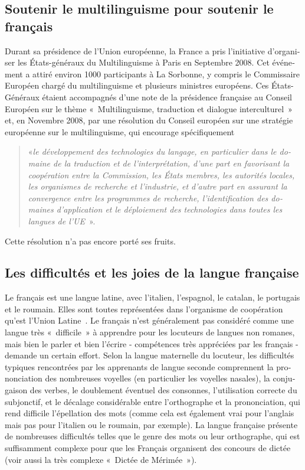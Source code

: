 \begin{french}
\begin{multicols}{2}
\subsection{Soutenir le multilinguisme pour soutenir le français}

Durant sa présidence de l'Union européenne, la France a pris
l'initiative d'organiser les États-généraux du
Multilinguisme à Paris en Septembre 2008. Cet événement a attiré
environ 1000 participants à La Sorbonne, y compris le Commissaire
Européen chargé du multilinguisme et plusieurs ministres
européens. Ces États-Généraux étaient accompagnés d'une note
de la présidence française au Conseil Européen sur le thème
«~Multilinguisme, traduction et dialogue interculturel~» et, en
Novembre 2008, par une résolution du Conseil européen sur une
stratégie européenne sur le multilinguisme, qui encourage
spécifiquement 
\begin{quote}
«{\em le développement des technologies du langage, en
    particulier dans le domaine de la traduction et de l'interprétation, d'une part en favorisant la
    coopération entre la Commission, les États membres, les autorités
    locales, les organismes de recherche et l'industrie, et
    d'autre part en assurant la convergence entre les
    programmes de recherche, l'identification des domaines
    d'application et le déploiement des technologies dans
    toutes les langues de l'UE}~»\cite{eurlex}. 
\end{quote}
Cette résolution n'a pas encore porté ses fruits.

\subsection{Les difficultés et les joies de la langue française}

Le français est une langue latine, avec l'italien, l'espagnol, le catalan, le portugais et le roumain. Elles sont
toutes représentées dans l'organisme de coopération qu'est l'Union Latine~\cite{ulatine}. Le français n'est généralement pas considéré comme une langue très «~difficile~»
à apprendre pour les locuteurs de langues non romanes, mais bien le
parler et bien l'écrire - compétences très appréciées par les
français - demande un certain effort. Selon la langue maternelle du
locuteur, les difficultés typiques rencontrées par les apprenants de
langue seconde comprennent la prononciation des nombreuses voyelles
(en particulier les voyelles nasales), la conjugaison des verbes, le
doublement éventuel des consonnes, l'utilisation correcte du
subjonctif, et le décalage considérable entre l'orthographe et
la prononciation, qui rend difficile l'épellation des mots
(comme cela est également vrai pour l'anglais mais pas pour
l'italien ou le roumain, par exemple). La langue française
présente de nombreuses difficultés telles que le genre des mots ou
leur orthographe, qui est suffisamment complexe pour que les Français
organisent des concours de dictée (voir aussi la très complexe
«~Dictée de Mérimée~»).


\end{multicols}
\end{french}
